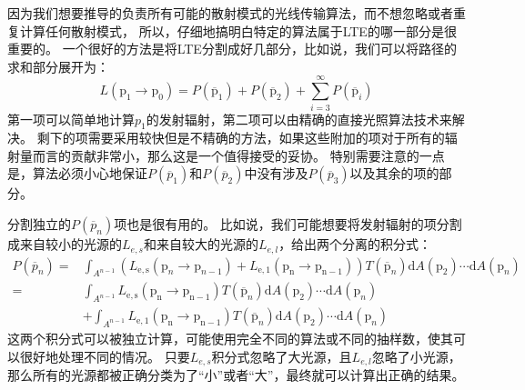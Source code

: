 \documentclass[a4paper]{article}
\begin{document}
	因为我们想要推导的负责所有可能的散射模式的光线传输算法，而不想忽略或者重复计算任何散射模式，
	所以，仔细地搞明白特定的算法属于LTE的哪一部分是很重要的。
	一个很好的方法是将LTE分割成好几部分，比如说，我们可以将路径的求和部分展开为：
	\begin{equation*}
		L\left(\mathrm{p}_{1} \rightarrow \mathrm{p}_{0}\right)=P\left(\overline{\mathrm{p}}_{1}\right)+P\left(\overline{\mathrm{p}}_{2}\right)+\sum_{i=3}^{\infty} P\left(\overline{\mathrm{p}}_{i}\right)
	\end{equation*}
	第一项可以简单地计算$p_1$的发射辐射，第二项可以由精确的直接光照算法技术来解决。
	剩下的项需要采用较快但是不精确的方法，如果这些附加的项对于所有的辐射量而言的贡献非常小，那么这是一个值得接受的妥协。
	特别需要注意的一点是，算法必须小心地保证$P(\overline{p}_1)$和$P(\overline{p}_2)$中没有涉及$P(\overline{p}_3)$以及其余的项的部分。

	分割独立的$P(\overline{p}_n)$项也是很有用的。
	比如说，我们可能想要将发射辐射的项分割成来自较小的光源的$L_{e,s}$和来自较大的光源的$L_{e,l}$，给出两个分离的积分式：
	\begin{equation*}
		\begin{aligned}
			P\left(\overline{p}_{n}\right)=& \int_{A^{n-1}}\left(L_{\mathrm{e}, \mathrm{s}}\left(\mathrm{p}_{n} \rightarrow \mathrm{p}_{n-1}\right)+L_{\mathrm{e}, 1}\left(\mathrm{p}_{\mathrm{n}} \rightarrow \mathrm{p}_{\mathrm{n}-1}\right)\right) T\left(\overline{\mathrm{p}}_{n}\right) \mathrm{d} A\left(\mathrm{p}_{2}\right) \cdots \mathrm{d} A\left(\mathrm{p}_{n}\right) \\
			=& \int_{A^{n-1}} L_{\mathrm{e}, \mathrm{s}}\left(\mathrm{p}_{\mathrm{n}} \rightarrow \mathrm{p}_{\mathrm{n}-1}\right) T\left(\overline{\mathrm{p}}_{n}\right) \mathrm{d} A\left(\mathrm{p}_{2}\right) \cdots \mathrm{d} A\left(\mathrm{p}_{n}\right) \\
			&+\int_{A^{n-1}} L_{\mathrm{e}, 1}\left(\mathrm{p}_{\mathrm{n}} \rightarrow \mathrm{p}_{\mathrm{n}-1}\right) T\left(\overline{\mathrm{p}}_{n}\right) \mathrm{d} A\left(\mathrm{p}_{2}\right) \cdots \mathrm{d} A\left(\mathrm{p}_{n}\right)
		\end{aligned}
	\end{equation*}
	这两个积分式可以被独立计算，可能使用完全不同的算法或不同的抽样数，使其可以很好地处理不同的情况。
	只要$L_{e,s}$积分式忽略了大光源，且$L_{e,l}$忽略了小光源，那么所有的光源都被正确分类为了“小”或者“大”，最终就可以计算出正确的结果。
\end{document}
